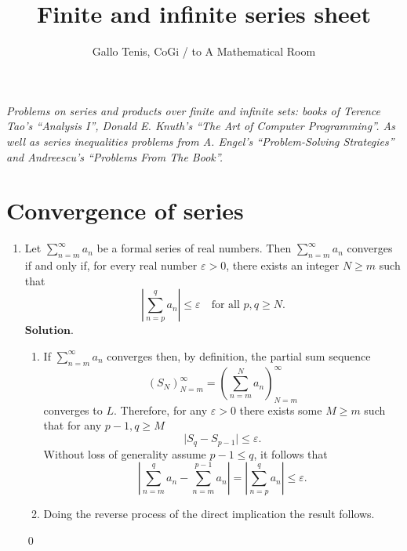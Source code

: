 \documentclass{article}
\title{Finite and infinite series sheet}
\author{Gallo Tenis, CoGi / to A Mathematical Room}
\theoremstyle{remark}
\begin{document}
\maketitle

\begin{center}
    \textit{Problems on series and products over finite and infinite sets: books of Terence Tao's ``Analysis I'', Donald E. Knuth's ``The Art of Computer Programming''.
    As well as series inequalities problems from A. Engel's ``Problem-Solving Strategies'' and Andreescu's ``Problems From The Book''.}
\end{center}
\section*{Convergence of series}
\begin{enumerate}
    \item Let \( \sum_{n=m}^{\infty} a_n \) be a formal series of real numbers. Then \( \sum_{n=m}^{\infty} a_n \) converges if and only if, for every real number \( \varepsilon > 0 \), there exists an integer \( N \geq m \) such that
    \[
    \left| \sum_{n=p}^{q} a_n \right| \leq \varepsilon \quad \text{for all } p,q \geq N.
    \]
    $\textbf{Solution.}$
    \begin{enumerate}
        \item[$(\implies)$] If $\sum_{n=m}^{\infty} a_n$ converges then, by definition, the partial sum sequence 
        \[
        (S_N)_{N=m}^{\infty} = \left(\sum_{n=m}^{N}a_n\right)_{N=m}^{\infty}
        \]
        converges to $L$.
        Therefore, for any $\varepsilon > 0$ there exists some $M \geq m$ such that for any $p-1,q \geq M$
        \[
        \vert S_q - S_{p-1} \vert \leq \varepsilon.
        \]
        Without loss of generality assume $p - 1 \leq q$, it follows that
        \[
        \left\lvert \sum_{n=m}^{q}a_n - \sum_{n=m}^{p-1}a_n \right\rvert = \left\lvert \sum_{n=p}^{q}a_n \right\rvert \leq \varepsilon.
        \]
        
        \item[$(\impliedby)$] Doing the reverse process of the direct implication the result follows.
    \end{enumerate}
    \begin{flushright}
        \qed
    \end{flushright}


\end{enumerate}
\end{document}
